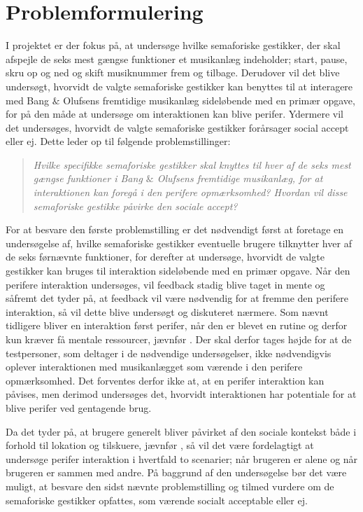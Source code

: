 \section{Problemformulering}
\label{Problemformulering}
%
I projektet er der fokus på, at undersøge hvilke semaforiske gestikker, der skal afspejle de seks mest gængse funktioner et musikanlæg indeholder; start, pause, skru op og ned og skift musiknummer frem og tilbage. Derudover vil det blive undersøgt, hvorvidt de valgte semaforiske gestikker kan benyttes til at interagere med Bang $\&$ Olufsens fremtidige musikanlæg sideløbende med en primær opgave, for på den måde at undersøge om interaktionen kan blive perifer. Ydermere vil det undersøges, hvorvidt de valgte semaforiske gestikker forårsager social accept eller ej. Dette leder op til følgende problemstillinger:\blankline
%
\begin{quotation}
	\noindent
	\textit{Hvilke specifikke semaforiske gestikker skal knyttes til hver af de seks mest gængse funktioner i Bang $\&$ Olufsens fremtidige musikanlæg, for at interaktionen kan foregå i den perifere opmærksomhed?\blankline
		Hvordan vil disse semaforiske gestikke påvirke den sociale accept?}\blankline
\end{quotation}
%
For at besvare den første problemstilling er det nødvendigt først at foretage en undersøgelse af, hvilke semaforiske gestikker eventuelle brugere tilknytter hver af de seks førnævnte funktioner, for derefter at undersøge, hvorvidt de valgte gestikker kan bruges til interaktion sideløbende med en primær opgave. Når den perifere interaktion undersøges, vil feedback stadig blive taget in mente og såfremt det tyder på, at feedback vil være nødvendig for at fremme den perifere interaktion, så vil dette blive undersøgt og diskuteret nærmere. Som nævnt tidligere bliver en interaktion først perifer, når den er blevet en rutine og derfor kun kræver få mentale ressourcer, jævnfør . Der skal derfor tages højde for at de testpersoner, som deltager i de nødvendige undersøgelser, ikke nødvendigvis oplever interaktionen med musikanlægget som værende i den perifere opmærksomhed. Det forventes derfor ikke at, at en perifer interaktion kan påvises, men derimod undersøges det, hvorvidt interaktionen har potentiale for at blive perifer ved gentagende brug. 

Da det tyder på, at brugere generelt bliver påvirket af den sociale kontekst både i forhold til lokation og tilskuere, jævnfør , så vil det være fordelagtigt at undersøge perifer interaktion i hvertfald to scenarier; når brugeren er alene og når brugeren er sammen med andre. På baggrund af den undersøgelse bør det være muligt, at besvare den sidst nævnte problemstilling og tilmed vurdere om de semaforiske gestikker opfattes, som værende socialt acceptable eller ej. 





